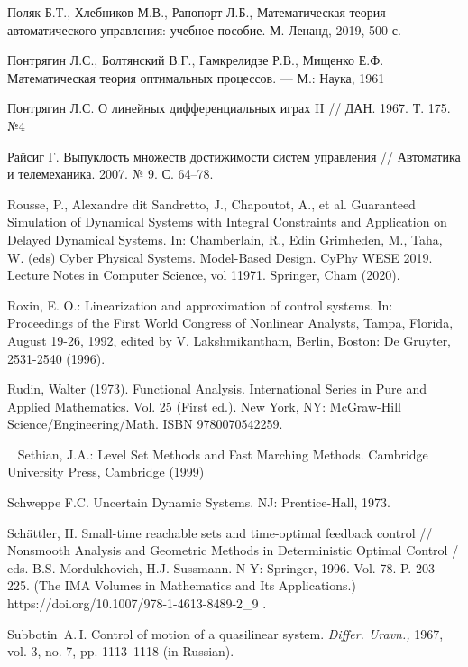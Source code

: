 \documentclass[../main.tex]{subfiles}
\begin{document}
\begin{thebibliography}{99}
Поляк Б.Т., Хлебников М.В., Рапопорт Л.Б., Математическая теория автоматического управления: учебное пособие. М. Ленанд, 2019, 500 с.

Понтрягин Л.С., Болтянский В.Г., Гамкрелидзе Р.В., Мищенко Е.Ф. Математическая теория оптимальных процессов. — М.: Наука, 1961

Понтрягин Л.С. О линейных дифференциальных играх II // ДАН. 1967. Т. 175. №4

Райсиг Г. Выпуклость множеств достижимости систем управления // Автоматика и телемеханика. 2007. № 9. С. 64–78.

Rousse, P., Alexandre dit Sandretto, J., Chapoutot, A., et al. Guaranteed Simulation of Dynamical Systems with Integral Constraints and Application on Delayed Dynamical Systems. In: Chamberlain, R., Edin Grimheden, M., Taha, W. (eds) Cyber Physical Systems. Model-Based Design. CyPhy WESE 2019. Lecture Notes in Computer Science, vol 11971. Springer, Cham (2020). 

Roxin, E. O.: Linearization and approximation of control systems. In: Proceedings of the First World Congress of Nonlinear Analysts, Tampa, Florida, August 19-26, 1992, edited by V. Lakshmikantham, Berlin, Boston: De Gruyter, 2531-2540 (1996). 

Rudin, Walter (1973). Functional Analysis. International Series in Pure and Applied Mathematics. Vol. 25 (First ed.). New York, NY: McGraw-Hill Science/Engineering/Math. ISBN 9780070542259.

Sethian, J.A.: Level Set Methods and Fast Marching Methods. Cambridge University Press,
Cambridge (1999)

Schweppe F.C. Uncertain Dynamic Systems. NJ: Prentice-Hall, 1973.

Sch\"{a}ttler, H. Small-time reachable sets and time-optimal feedback control // Nonsmooth Analysis and Geometric Methods in Deterministic Optimal Control / eds. B.S. Mordukhovich, H.J. Sussmann.
N Y: Springer, 1996. Vol. 78. P. 203–225. (The IMA Volumes in Mathematics and Its Applications.)
https://doi.org/10.1007/978-1-4613-8489-2\_9 .

Subbotin~A.\,I. Control of motion of a quasilinear system. \emph{Differ. Uravn.,} 1967, vol. 3, no. 7, pp. 1113–1118
(in Russian).


\end{thebibliography}
\end{document}
